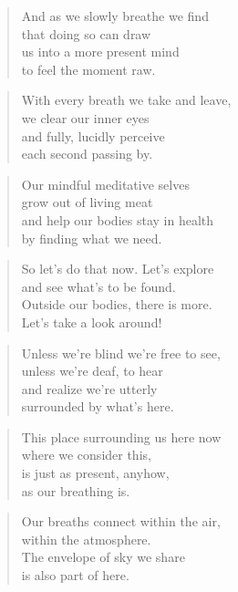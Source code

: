 \documentclass[10pt,a4paper]{article}
\begin{document}
\begin{multicols}{2}
\begin{verse}
And as we slowly breathe we find\\
that doing so can draw\\
us into a more present mind\\
to feel the moment raw.
\end{verse}

\begin{verse}
With every breath we take and leave,\\
we clear our inner eyes\\
and fully, lucidly perceive\\
each second passing by.
\end{verse}

\begin{verse}
Our mindful meditative selves\\
grow out of living meat\\
and help our bodies stay in health\\
by finding what we need.
\end{verse}

\begin{verse}
So let’s do that now. Let’s explore\\
and see what’s to be found.\\
Outside our bodies, there is more.\\
Let’s take a look around!
\end{verse}

\begin{verse}
Unless we’re blind we’re free to see,\\
unless we’re deaf, to hear\\
and realize we’re utterly\\
surrounded by what’s here.
\end{verse}

\begin{verse}
This place surrounding us here now\\
where we consider this,\\
is just as present, anyhow,\\
as our breathing is.
\end{verse}

\begin{verse}
Our breaths connect within the air,\\
within the atmosphere.\\
The envelope of sky we share\\
is also part of here.
\end{verse}


\end{multicols}
\end{document}
